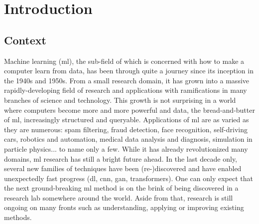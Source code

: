 \chapter{Introduction}

\section{Context}

Machine learning (\acrshort{ml}), the sub-field of  which is concerned with how to make a computer learn from data, has been through quite a journey since its inception in the 1940s and 1950s. From a small research domain, it has grown into a massive rapidly-developing field of research and applications with ramifications in many branches of science and technology. This growth is not surprising in a world where computers become more and more powerful and data, the bread-and-butter of \acrlong{ml}, increasingly structured and queryable. Applications of \acrlong{ml} are as varied as they are numerous: spam filtering, fraud detection, face recognition, self-driving cars, robotics and automation, medical data analysis and diagnosis, simulation in particle physics... to name only a few. While it has already revolutionized many domains, \acrlong{ml} research has still a bright future ahead. In the last decade only, several new families of techniques have been (re-)discovered and have enabled unexpectedly fast progress (\eg \acrlong{dl}, \acrlong{cnn}, \acrlong{gan}, transformers). One can only expect that the next ground-breaking \acrshort{ml} method is on the brink of being discovered in a research lab somewhere around the world. Aside from that, research is still ongoing on many fronts such as understanding, applying or improving existing methods.

